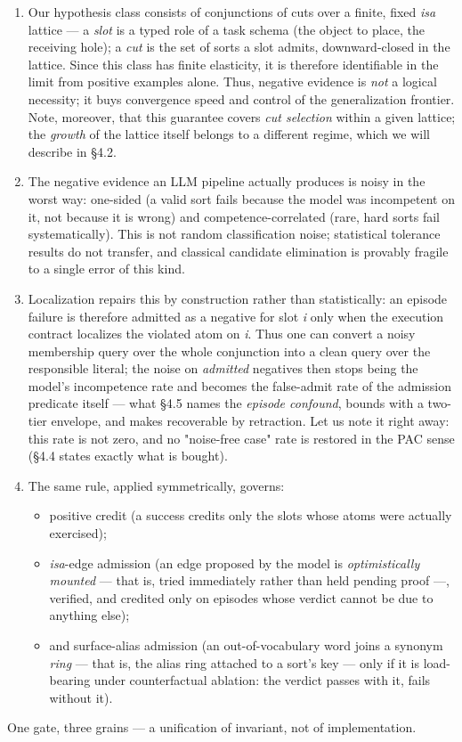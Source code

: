 \documentclass[11pt]{article}
\begin{document}
\begin{enumerate}
\item Our hypothesis class consists of conjunctions of cuts over a finite, fixed \emph{isa} lattice — a \emph{slot} is a typed role of a task schema (the object to place, the receiving hole); a \emph{cut} is the set of sorts a slot admits, downward-closed in the lattice. Since this class has finite elasticity, it is therefore identifiable in the limit from positive examples alone. Thus, negative evidence is \emph{not} a logical necessity; it buys convergence speed and control of the generalization frontier. Note, moreover, that this guarantee covers \emph{cut selection} within a given lattice; the \emph{growth} of the lattice itself belongs to a different regime, which we will describe in §4.2.
\item The negative evidence an LLM pipeline actually produces is noisy in the worst way: one-sided (a valid sort fails because the model was incompetent on it, not because it is wrong) and competence-correlated (rare, hard sorts fail systematically). This is not random classification noise; statistical tolerance results do not transfer, and classical candidate elimination is provably fragile to a single error of this kind.
\item Localization repairs this by construction rather than statistically: an episode failure is therefore admitted as a negative for slot \emph{i} only when the execution contract localizes the violated atom on \emph{i}. Thus one can convert a noisy membership query over the whole conjunction into a clean query over the responsible literal; the noise on \emph{admitted} negatives then stops being the model's incompetence rate and becomes the false-admit rate of the admission predicate itself — what §4.5 names the \emph{episode confound}, bounds with a two-tier envelope, and makes recoverable by retraction. Let us note it right away: this rate is not zero, and no "noise-free case" rate is restored in the PAC sense (§4.4 states exactly what is bought).
\item The same rule, applied symmetrically, governs:
\begin{itemize}
\item positive credit (a success credits only the slots whose atoms were actually exercised);
\item \emph{isa}-edge admission (an edge proposed by the model is \emph{optimistically mounted} — that is, tried immediately rather than held pending proof —, verified, and credited only on episodes whose verdict cannot be due to anything else);
\item and surface-alias admission (an out-of-vocabulary word joins a synonym \emph{ring} — that is, the alias ring attached to a sort's key — only if it is load-bearing under counterfactual ablation: the verdict passes with it, fails without it).

\end{itemize}
\end{enumerate}
One gate, three grains — a unification of invariant, not of implementation.
\end{document}
